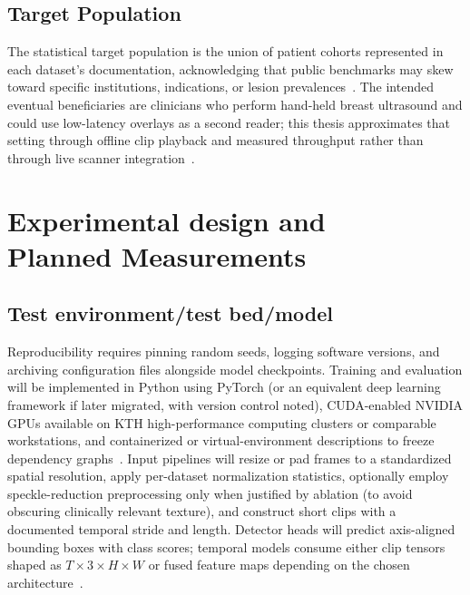\documentclass[
english,                 %
bibtex,                  %
]{kththesis}
\numberwithin{listing}{chapter}
\begin{document}
\subsection{Target Population}

The statistical target population is the union of patient cohorts represented in each dataset's documentation, acknowledging that public benchmarks may skew toward specific institutions, indications, or lesion prevalences~\cite{dan2024_breast_us_dl_review,lin2022_buv_miccai}.
The intended eventual beneficiaries are clinicians who perform hand-held breast ultrasound and could use low-latency overlays as a second reader; this thesis approximates that setting through offline clip playback and measured throughput rather than through live scanner integration~\cite{liu2023_edgemednet}.

\section[Experimental design/Planned Measurements]{Experimental design and\\Planned Measurements}
\label{sec:experimentalDesign}

\subsection{Test environment/test bed/model}

Reproducibility requires pinning random seeds, logging software versions, and archiving configuration files alongside model checkpoints.
Training and evaluation will be implemented in Python using PyTorch (or an equivalent deep learning framework if later migrated, with version control noted), CUDA-enabled NVIDIA GPUs available on KTH high-performance computing clusters or comparable workstations, and containerized or virtual-environment descriptions to freeze dependency graphs~\cite{lin2022_buv_miccai}.
Input pipelines will resize or pad frames to a standardized spatial resolution, apply per-dataset normalization statistics, optionally employ speckle-reduction preprocessing only when justified by ablation (to avoid obscuring clinically relevant texture), and construct short clips with a documented temporal stride and length.
Detector heads will predict axis-aligned bounding boxes with class scores; temporal models consume either clip tensors shaped as $T \times 3 \times H \times W$ or fused feature maps depending on the chosen architecture~\cite{redmon2018_yolov3,lin2017_focal_loss_retinanet,shi2015_convlstm,feichtenhofer2019_slowfast}.
\end{document}
